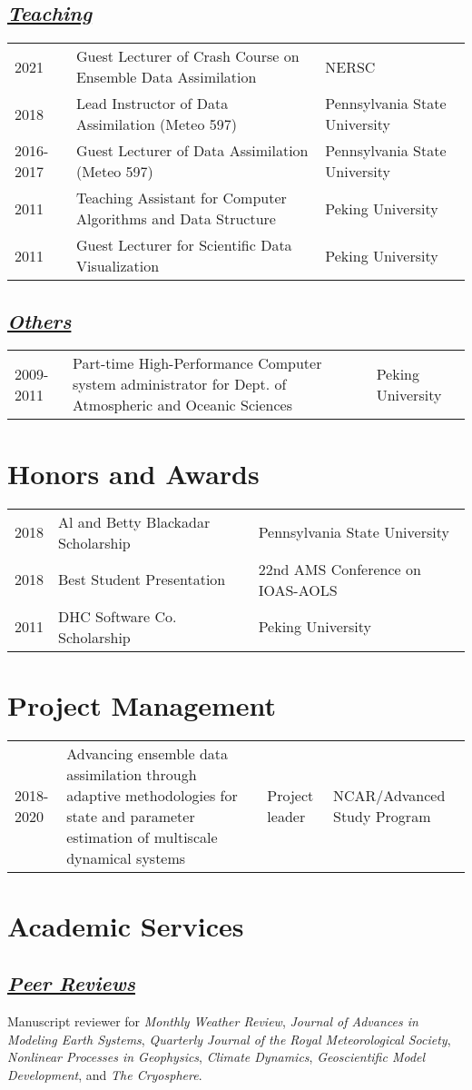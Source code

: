 \documentclass{article}
\newcommand{\cvsection}[1]{\section*{\bfseries#1}}
\newcommand{\cvsubsection}[1]{\subsection*{\itshape\uline{#1}}}
\begin{document}
\cvsubsection{Teaching}
\begin{tabular}{l p{9cm} l}
    2021 & Guest Lecturer of Crash Course on Ensemble Data Assimilation & NERSC \\
    2018 & Lead Instructor of Data Assimilation (Meteo 597) & Pennsylvania State University \\
    2016-2017 & Guest Lecturer of Data Assimilation (Meteo 597) & Pennsylvania State University \\
    2011 & Teaching Assistant for Computer Algorithms and Data Structure & Peking University \\
    2011 & Guest Lecturer for Scientific Data Visualization & Peking University \\
\end{tabular}

\cvsubsection{Others}
\begin{tabular}{l p{9cm} l}
    2009-2011 & Part-time High-Performance Computer system administrator for Dept. of Atmospheric and Oceanic Sciences & Peking University \\
\end{tabular}

\cvsection{Honors and Awards}
\begin{tabular}{l l l}
    2018 & Al and Betty Blackadar Scholarship & Pennsylvania State University \\
    2018 & Best Student Presentation & 22nd AMS Conference on IOAS-AOLS \\
    2011 & DHC Software Co. Scholarship & Peking University \\
\end{tabular}


\cvsection{Project Management}
\begin{tabular}{l p{8cm} p{2cm} p{3cm}}
    2018-2020 & Advancing ensemble data assimilation through adaptive methodologies for state and parameter estimation of multiscale dynamical systems & Project leader & NCAR/Advanced Study Program \\
\end{tabular}


\cvsection{Academic Services}
\cvsubsection{Peer Reviews}
Manuscript reviewer for
\textit{Monthly Weather Review},
\textit{Journal of Advances in Modeling Earth Systems},
\textit{Quarterly Journal of the Royal Meteorological Society},
\textit{Nonlinear Processes in Geophysics},
\textit{Climate Dynamics},
\textit{Geoscientific Model Development},
and
\textit{The Cryosphere}.
\end{document}
